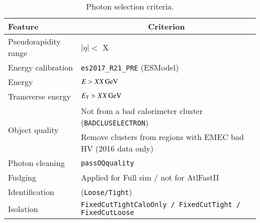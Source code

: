 \begin{table}[ht]
  \caption{Photon selection criteria.}%
  \label{tab:object:photon} 
  \centering
  \begin{tabular}{ll}
    \toprule
    Feature & \multicolumn{1}{c}{Criterion} \\
    \midrule
    Pseudorapidity range & \(|\eta| <\) X\\
    Energy calibration & \texttt{es2017\_R21\_PRE} (ESModel)\\
    Energy & \(E > \qty[parse-numbers=false]{XX}{\GeV}\) \\
    Transverse energy & \(\ET > \qty[parse-numbers=false]{XX}{\GeV}\) \\
    \midrule
    \multirow{2}{*}{Object quality} & Not from a bad calorimeter cluster (\texttt{BADCLUSELECTRON})\\ %
      & Remove clusters from regions with EMEC bad HV (2016 data only) \\
    \midrule
    Photon cleaning & \texttt{passOQquality} \\
    Fudging & Applied for Full sim / not for AtlFastII \\
    \midrule
    Identification & (\texttt{Loose/Tight}) \\
    Isolation &  \texttt{FixedCutTightCaloOnly / FixedCutTight / FixedCutLoose} \\
    \bottomrule
  \end{tabular}
\end{table}


